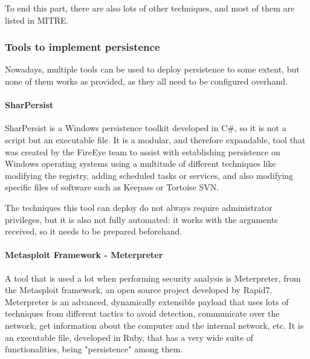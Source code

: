 To end this part, there are also lots of other techniques, and most of them are listed in MITRE\cite{Mitre}.

\subsubsection{Tools to implement persistence}
\label{sssec:windowsTools}
Nowadays, multiple tools can be used to deploy persistence to some extent, but none of them works as provided, as they all need to be configured overhand.

\paragraph{SharPersist}
SharPersist\cite{SharPersist} is a Windows persistence toolkit developed in C\#, so it is not a script but an executable file. It is a modular, and therefore expandable, tool that was created by the FireEye\cite{FireEyeWeb} team to assist with establishing persistence on Windows operating systems using a multitude of different techniques like modifying the registry, adding scheduled tasks or services, and also modifying specific files of software such as Keepass\cite{KeePassWeb} or Tortoise SVN\cite{TortoiseSVNWeb}. 


The techniques this tool can deploy do not always require administrator privileges, but it is also not fully automated: it works with the arguments received, so it needs to be prepared beforehand.


\paragraph{Metasploit Framework - Meterpreter}
A tool that is used a lot when performing security analysis is Meterpreter, from the Metasploit framework\cite{Metasploit}, an open source project developed by Rapid7\cite{Rapid7Web}. Meterpreter is an advanced, dynamically extensible payload that uses lots of techniques from different tactics to avoid detection, communicate over the network, get information about the computer and the internal network, etc. It is an executable file, developed in Ruby, that has a very wide suite of functionalities, being "persistence" among them\cite{Meterpreter}.

